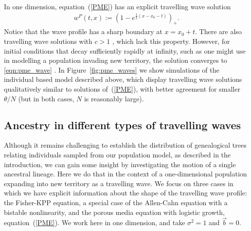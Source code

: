 \documentclass[EJP]{ejpecp} %
\newcommand{\meanq}{\vec b}    %
\newcommand{\comment}[1]{{\color{blue} \it #1}}
\newcommand{\citep}[1]{\cite{#1}}
\begin{document}
In one dimension, equation~(\ref{PME}) has an explicit travelling wave solution
\begin{align} \label{eqn:pme_wave}
    w^P(t, x)
    :=
    \left( 1 - e^{ \frac{1}{2} (x - x_0 - t) } \right)_+ .
\end{align}
Notice that the wave profile has a sharp boundary at $x = x_0 + t$.
There are also travelling wave solutions with $c>1$ \citep{gilding/kersner:2005},
which lack this property.
However, for initial conditions that decay sufficiently rapidly at infinity,
such as one might use in modelling a population invading new territory,
the solution converges to \eqref{eqn:pme_wave} \citep{kamin/rosenau:2004}.
In Figure~\ref{fig:pme_waves} we show simulations of the individual based model described above,
which display travelling wave solutions qualitatively similar to solutions of~(\ref{PME}),
with better agreement for smaller $\theta/N$
(but in both cases, $N$ is reasonably large).


\subsection{Ancestry in different types of travelling waves}
\label{ancestral lineages for travelling waves}


Although it remains challenging to establish the distribution of genealogical
trees relating individuals sampled from our population model, as described in
the introduction, we can gain some insight by investigating the motion of a
single ancestral lineage. Here we do that in the context of a one-dimensional
population expanding into new territory as a travelling wave. 
We focus on three cases in which we have 
explicit information about the shape of the travelling wave profile:
the Fisher-KPP equation,
a special case of the Allen-Cahn equation with a bistable nonlinearity,
and the porous media equation with logistic growth, equation~(\ref{PME}).
We work here in one dimension,
and take $\sigma^2 = 1$ and $\meanq = 0$.
\end{document}
